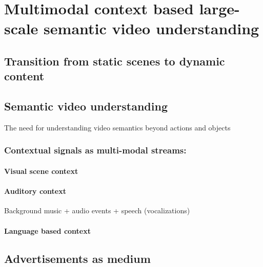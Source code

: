\chapter{Multimodal context based large-scale semantic video understanding}
\section{Transition from static scenes to dynamic content}
\section{Semantic video understanding}
The need for understanding video semantics beyond actions and objects 

\subsection{Contextual signals as multi-modal streams:}
    \subsubsection{Visual scene context}
    \subsubsection{Auditory context}
    Background music + audio events + speech (vocalizations)
    \subsubsection{Language based context}
\section{Advertisements as medium}
